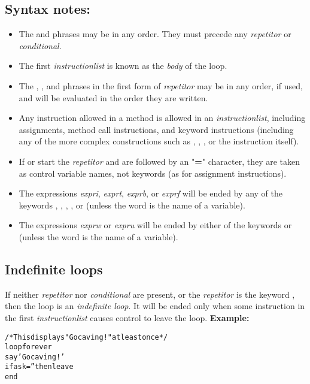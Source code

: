 \subsection{Syntax notes:}
\begin{itemize}
\item 
The  and  phrases may be in any order.
They must precede any \emph{repetitor} or \emph{conditional}.
\item 
{}
The first \emph{instructionlist} is known as the \emph{body} of
the loop.
\item 
The , , and  phrases in the first form
of \emph{repetitor} may be in any order, if used, and will be
evaluated in the order they are written.
\item 
Any instruction allowed in a method is allowed in an
\emph{instructionlist}, including assignments, method call
instructions, and keyword instructions (including any of the more
complex constructions such as , , ,
or the  instruction itself).
\item 
If  or  start the \emph{repetitor} and
are followed by an "\textbf{=}" character, they are taken as
control variable names, not keywords (as for assignment instructions).
\item 
The expressions \emph{expri}, \emph{exprt}, \emph{exprb}, or
\emph{exprf} will be ended by any of the keywords ,
, , , or  (unless
the word is the name of a variable).
\item 
The expressions \emph{exprw} or \emph{expru} will be ended by
either of the keywords  or  (unless the
word is the name of a variable).
\end{itemize}
\subsection{Indefinite loops}
 If neither \emph{repetitor} nor \emph{conditional} are
present, or the \emph{repetitor} is the keyword ,
then the loop is an \emph{indefinite loop}.
It will be ended only when some instruction in the first
\emph{instructionlist} causes control to leave the loop.
 \textbf{Example:}
\begin{alltt}
/* This displays "Go caving!" at least once */
loop forever
  say 'Go caving!'
  if ask='' then leave
  end
\end{alltt}
